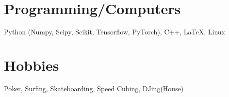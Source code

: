 \documentclass[11pt,a4paper,roman]{moderncv}        %
\begin{document}
\section{Programming/Computers}
{Python (Numpy, Scipy, Scikit, Tensorflow, PyTorch), C++, \LaTeX, Linux}

\section{Hobbies}
{Poker, Surfing, Skateboarding, Speed Cubing, DJing(House)}
\end{document}
